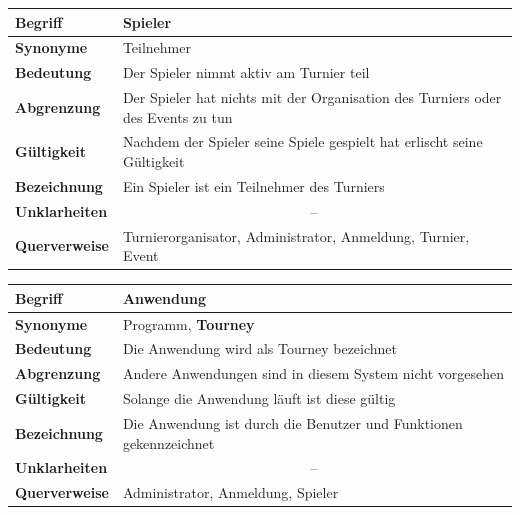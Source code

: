 \documentclass[11pt]{article}
\begin{document}
\begin{tabularx}{\textwidth}{| p{} | p{} |}
	\hline
	\textbf{Begriff} & Spieler\\
	\hline
	\textbf{Synonyme} & Teilnehmer \\
	\hline
	\textbf{Bedeutung} & Der Spieler nimmt aktiv am Turnier teil\\
	\hline
	\textbf{Abgrenzung} & Der Spieler hat nichts mit der Organisation des Turniers oder des Events zu tun\\
	\hline
	\textbf{Gültigkeit} & Nachdem der Spieler seine Spiele gespielt hat erlischt seine Gültigkeit\\
	\hline
	\textbf{Bezeichnung} & Ein Spieler ist ein Teilnehmer des Turniers\\
	\hline
	\textbf{Unklarheiten} & \multicolumn{1}{|c|}{--} \\
	\hline
	\textbf{Querverweise} & Turnierorganisator, Administrator, Anmeldung, Turnier, Event \\
	\hline
\end{tabularx}

\begin{tabularx}{\textwidth}{| p{} | p{} |}
	\hline
	\textbf{Begriff} & Anwendung\\
	\hline
	\textbf{Synonyme} & Programm, \textbf{Tourney}\\
	\hline
	\textbf{Bedeutung} & Die Anwendung wird als Tourney bezeichnet\\
	\hline
	\textbf{Abgrenzung} & Andere Anwendungen sind in diesem System nicht vorgesehen\\
	\hline
	\textbf{Gültigkeit} & Solange die Anwendung läuft ist diese gültig\\
	\hline
	\textbf{Bezeichnung} & Die Anwendung ist durch die Benutzer und Funktionen gekennzeichnet\\
	\hline
	\textbf{Unklarheiten} & \multicolumn{1}{|c|}{--} \\
	\hline
	\textbf{Querverweise} & Administrator, Anmeldung, Spieler \\
	\hline
\end{tabularx}

\newpage
\end{document}
